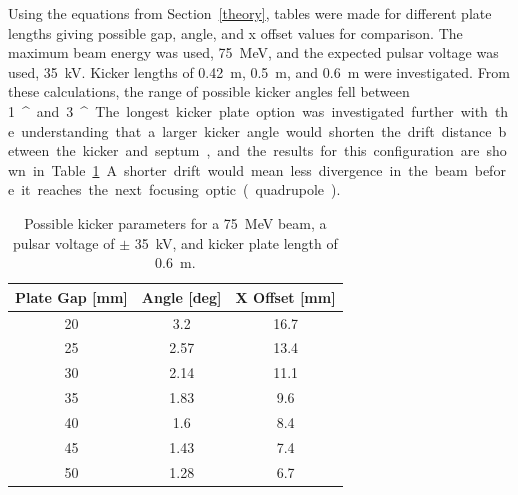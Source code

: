 Using the equations from Section~\ref{theory}, 
tables were made for different plate lengths giving possible gap, angle, and x offset values for comparison. 
The maximum beam energy was used, \SI{75}{MeV}, and the expected pulsar voltage was used, \SI{35}{kV}.
Kicker lengths of \SI{0.42}{m}, \SI{0.5}{m}, and \SI{0.6}{m} were investigated.
From these calculations, the range of possible kicker angles fell between \SI{1}{^\circ} and \SI{3}{^\circ}.
The longest kicker plate option was investigated further with the understanding that 
a larger kicker angle would shorten the drift distance between the kicker and septum, 
and the results for this configuration are shown in Table~\ref{tab:kickparam}.
A shorter drift would mean less divergence in the beam before it reaches the next focusing optic (quadrupole).
\begin{table}%
	\begin{center}
		\caption{Possible kicker parameters for a \SI{75}{MeV} beam,  
		a pulsar voltage of $\pm$ \SI{35}{kV}, 
		and kicker plate length of \SI{0.6}{m}.}\label{tab:kickparam}
	\begin{tabular}{ccc}
		\toprule
		\toprule
		\textbf{Plate Gap [mm]} & \textbf{Angle [deg]}  & \textbf{X Offset [mm]} \\ 
		\midrule
		20 & 3.2   & 16.7    \\ %
		25 & 2.57  & 13.4  \\ %
		30 & 2.14  & 11.1 \\		 
		35 & 1.83  & 9.6	  \\
		40 & 1.6   & 8.4		 \\
		45 & 1.43  & 7.4      \\
		50 & 1.28  & 6.7   \\ 
		\bottomrule
	\end{tabular}	
	\end{center}
\end{table}

